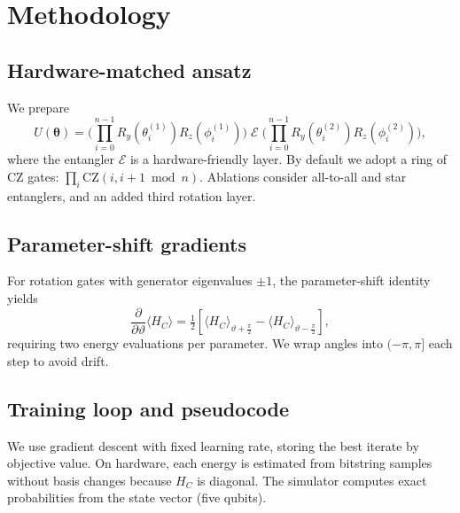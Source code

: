 \section{Methodology}
\subsection{Hardware-matched ansatz}
We prepare
\begin{equation}
U(\boldsymbol{\theta}) = \Big(\prod_{i=0}^{n-1} R_y(\theta^{(1)}_i) R_z(\phi^{(1)}_i)\Big)\; \mathcal{E}\; \Big(\prod_{i=0}^{n-1} R_y(\theta^{(2)}_i) R_z(\phi^{(2)}_i)\Big),
\end{equation}
where the entangler $\mathcal{E}$ is a hardware-friendly layer. By default we adopt a ring of CZ gates: $\prod_{i} \mathrm{CZ}(i, i{+}1 \bmod n)$. Ablations consider all-to-all and star entanglers, and an added third rotation layer.

\subsection{Parameter-shift gradients}
For rotation gates with generator eigenvalues $\pm 1$, the parameter-shift identity yields \cite{schuld2019gradients,mitarai2018quantum}
\begin{equation}
\frac{\partial}{\partial \vartheta} \langle H_C \rangle
= \tfrac{1}{2}\left[\langle H_C \rangle_{\vartheta+\frac{\pi}{2}} - \langle H_C \rangle_{\vartheta-\frac{\pi}{2}}\right],
\end{equation}
requiring two energy evaluations per parameter. We wrap angles into $(-\pi,\pi]$ each step to avoid drift.

\subsection{Training loop and pseudocode}
We use gradient descent with fixed learning rate, storing the best iterate by objective value. On hardware, each energy is estimated from bitstring samples without basis changes because $H_C$ is diagonal. The simulator computes exact probabilities from the state vector (five qubits).

